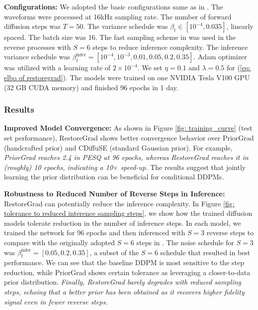 \noindent\textbf{Configurations:} 
We adopted the basic configurations same as in \citet{lu2022conditional}. The waveforms were processed at 16kHz sampling rate. The number of forward diffusion steps was $T=50$. The variance schedule was $\beta_t\in[10^{-4}, 0.035]$, linearly spaced. The batch size was 16. The fast sampling scheme in \citet{kong2020diffwave} was used in the reverse processes with $S=6$ steps to reduce inference complexity. The inference variance schedule was $\beta^{\text{infer}}_t=[10^{-4}, 10^{-3}, 0.01, 0.05, 0.2, 0.35]$. Adam optimizer \citep{kingma2014adam} was utilized with a learning rate of $2\times 10^{-4}$. We set $\eta=0.1$ and $\lambda=0.5$ for (\ref{eq: elbo of restoregrad}). The models were trained on one NVIDIA Tesla V100 GPU (32 GB CUDA memory) and finished 96 epochs in 1 day.

\subsubsection{Results}

\noindent\textbf{Improved Model Convergence:} 
As shown in Figure \ref{fig: training_curve} (test set performance), RestoreGrad shows better convergence behavior over PriorGrad (handcrafted prior) and CDiffuSE (standard Gaussian prior). For example, \textit{PriorGrad reaches 2.4 in PESQ at 96 epochs, whereas RestoreGrad reaches it in (roughly) 10 epochs, indicating a 10$\times$ speed-up.} The results suggest that jointly learning the prior distribution can be beneficial for conditional DDPMs.

\noindent\textbf{Robustness to Reduced Number of Reverse Steps in Inference:} 
RestoreGrad can potentially reduce the inference complexity. In Figure \ref{fig: tolerance to reduced interence sampling steps}, we show how the trained diffusion models tolerate reduction in the number of inference steps. In each model, we trained the network for 96 epochs and then inferenced with $S=3$ reverse steps to compare with the originally adopted $S=6$ steps in \citet{lu2022conditional}. The noise schedule for $S=3$ was $\beta^{\text{infer}}_t=[0.05, 0.2, 0.35]$, a subset of the $S=6$ schedule that resulted in best performance. We can see that the baseline DDPM is most sensitive to the step reduction, while PriorGrad shows certain tolerance as leveraging a closer-to-data prior distribution. \textit{Finally, RestoreGrad barely degrades with reduced sampling steps, echoing that a better prior has been obtained as it recovers higher fidelity signal even in fewer reverse steps}. 


